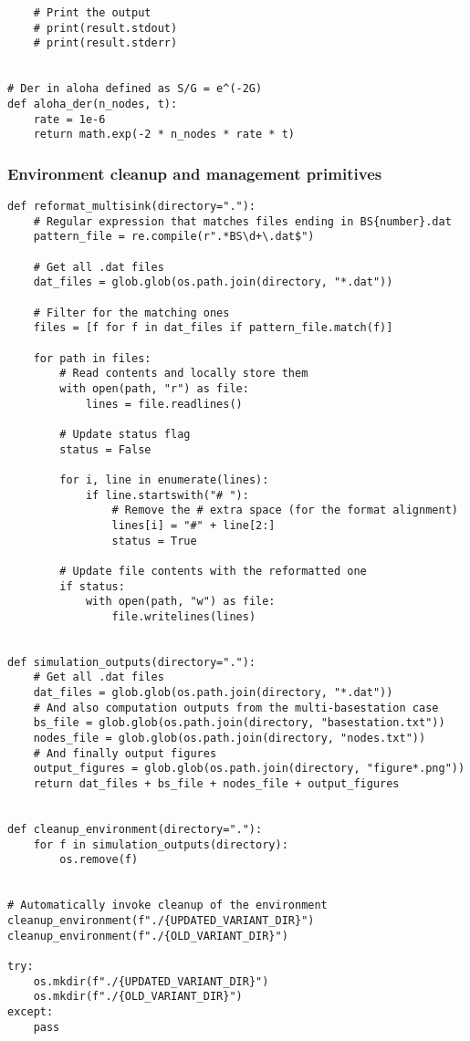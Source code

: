 \documentclass[a4paper,11pt]{article} %
\begin{document}
\begin{verbatim}
    # Print the output
    # print(result.stdout)
    # print(result.stderr)


# Der in aloha defined as S/G = e^(-2G)
def aloha_der(n_nodes, t):
    rate = 1e-6
    return math.exp(-2 * n_nodes * rate * t)
    \end{verbatim}

    \subsubsection*{Environment cleanup and management primitives}

    \begin{verbatim}
def reformat_multisink(directory="."):
    # Regular expression that matches files ending in BS{number}.dat
    pattern_file = re.compile(r".*BS\d+\.dat$")

    # Get all .dat files
    dat_files = glob.glob(os.path.join(directory, "*.dat"))

    # Filter for the matching ones
    files = [f for f in dat_files if pattern_file.match(f)]

    for path in files:
        # Read contents and locally store them
        with open(path, "r") as file:
            lines = file.readlines()

        # Update status flag
        status = False

        for i, line in enumerate(lines):
            if line.startswith("# "):
                # Remove the # extra space (for the format alignment)
                lines[i] = "#" + line[2:]
                status = True

        # Update file contents with the reformatted one
        if status:
            with open(path, "w") as file:
                file.writelines(lines)


def simulation_outputs(directory="."):
    # Get all .dat files
    dat_files = glob.glob(os.path.join(directory, "*.dat"))
    # And also computation outputs from the multi-basestation case
    bs_file = glob.glob(os.path.join(directory, "basestation.txt"))
    nodes_file = glob.glob(os.path.join(directory, "nodes.txt"))
    # And finally output figures
    output_figures = glob.glob(os.path.join(directory, "figure*.png"))
    return dat_files + bs_file + nodes_file + output_figures


def cleanup_environment(directory="."):
    for f in simulation_outputs(directory):
        os.remove(f)


# Automatically invoke cleanup of the environment
cleanup_environment(f"./{UPDATED_VARIANT_DIR}")
cleanup_environment(f"./{OLD_VARIANT_DIR}")

try:
    os.mkdir(f"./{UPDATED_VARIANT_DIR}")
    os.mkdir(f"./{OLD_VARIANT_DIR}")
except:
    pass
    \end{verbatim}
\end{document}
